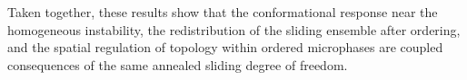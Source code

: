Taken together, these results show that the conformational response near the homogeneous instability, the redistribution of the sliding ensemble after ordering, and the spatial regulation of topology within ordered microphases are coupled consequences of the same annealed sliding degree of freedom.


    
    
    
    
    
